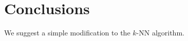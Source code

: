 \documentclass{article}
\begin{document}
\section{Conclusions}

We suggest a simple modification to the $k$-NN algorithm.



\end{document}
